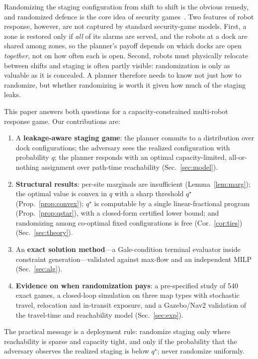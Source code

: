 \documentclass[10pt,twocolumn,letterpaper]{article}
\theoremstyle{remark}
\begin{document}
Randomizing the staging configuration from shift to shift is the obvious remedy, and randomized defence is the core idea of security games~\cite{tambe2011,korzhyk2011}. Two features of robot response, however, are not captured by standard security-game models. First, a zone is restored only if \emph{all} of its alarms are served, and the robots at a dock are shared among zones, so the planner's payoff depends on which docks are open \emph{together}, not on how often each is open. Second, robots must physically relocate between shifts and staging is often partly visible: randomization is only as valuable as it is concealed. A planner therefore needs to know not just how to randomize, but whether randomizing is worth it given how much of the staging leaks.

This paper answers both questions for a capacity-constrained multi-robot response game. Our contributions are:
\begin{enumerate}
\item A \textbf{leakage-aware staging game}: the planner commits to a distribution over dock configurations; the adversary sees the realized configuration with probability $q$; the planner responds with an optimal capacity-limited, all-or-nothing assignment over path-time reachability (Sec.~\ref{sec:model}).
\item \textbf{Structural results}: per-site marginals are insufficient (Lemma~\ref{lem:marg}); the optimal value is convex in $q$ with a sharp threshold $q^\star$ (Prop.~\ref{prop:convex}); $q^\star$ is computable by a single linear-fractional program (Prop.~\ref{prop:qstar}), with a closed-form certified lower bound; and randomizing among co-optimal fixed configurations is free (Cor.~\ref{cor:ties}) (Sec.~\ref{sec:theory}).
\item An \textbf{exact solution method}---a Gale-condition terminal evaluator inside constraint generation---validated against max-flow and an independent MILP (Sec.~\ref{sec:alg}).
\item \textbf{Evidence on when randomization pays}: a pre-specified study of 540 exact games, a closed-loop simulation on three map types with stochastic travel, relocation and in-transit exposure, and a Gazebo/Nav2 validation of the travel-time and reachability model (Sec.~\ref{sec:exp}).
\end{enumerate}
The practical message is a deployment rule: randomize staging only where reachability is sparse and capacity tight, and only if the probability that the adversary observes the realized staging is below $q^\star$; never randomize uniformly.
\end{document}
